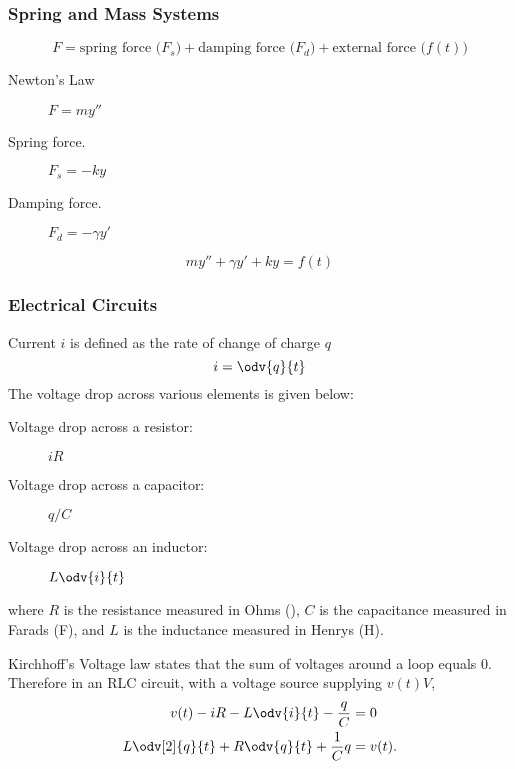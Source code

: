 \documentclass{article}
\begin{document}
\subsubsection{Spring and Mass Systems}
\begin{equation*}
    F = \text{spring force (\(F_s\))} + \text{damping force (\(F_d\))} + \text{external force (\(f(t)\))}
\end{equation*}
\begin{description}
    \item[Newton's Law] \(F = m y''\)
    \item[Spring force.] \(F_s = -k y\)
    \item[Damping force.] \(F_d = -\gamma y'\)
\end{description}
\begin{equation*}
    m y'' + \gamma y' + k y = f(t)
\end{equation*}
\subsubsection{Electrical Circuits}
Current \(i\) is defined as the rate of change of charge \(q\)
\begin{equation*}
    i = \odv{q}{t}
\end{equation*}
The voltage drop across various elements is given below:
\begin{description}
    \item[Voltage drop across a resistor:] \(iR\)
    \item[Voltage drop across a capacitor:] \(q/C\)
    \item[Voltage drop across an inductor:] \(L \odv{i}{t}\)
\end{description}
where \(R\) is the resistance measured in Ohms (\unit{\Omega}),
\(C\) is the capacitance measured in Farads (\unit{F}),
and \(L\) is the inductance measured in Henrys (\unit{H}).

Kirchhoff's Voltage law states that the sum of voltages around a loop equals 0.
Therefore in an RLC circuit, with a voltage source supplying \(v(t)\unit{V}\),
\begin{align*}
    v(t) - iR - L \odv{i}{t} - \frac{q}{C}      & = 0     \\
    L \odv[2]{q}{t} + R\odv{q}{t} + \frac{1}{C}q & = v(t).
\end{align*}
\end{document}
